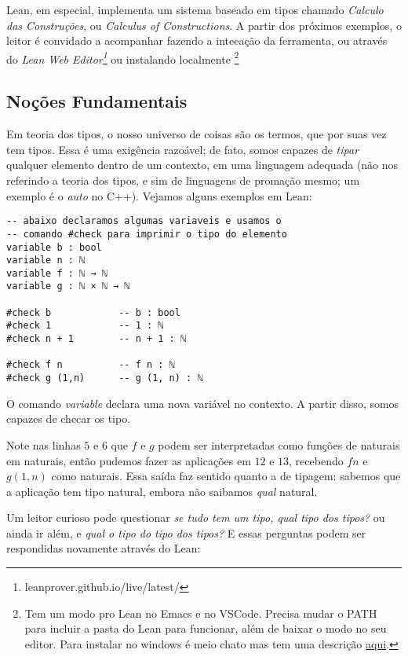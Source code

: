 Lean, em especial, implementa um sistema baseado em tipos chamado \textit{Calculo das Construções}, ou \textit{Calculus of Constructions}. A partir dos próximos exemplos, o leitor é convidado a acompanhar fazendo a inteeação da ferramenta, ou através do \textit{Lean Web Editor\footnote{leanprover.github.io/live/latest/}} ou instalando localmente \footnote{Tem um modo pro Lean no Emacs e no VSCode. Precisa mudar o PATH para incluir a pasta do Lean para funcionar, além de baixar o modo no seu editor. Para instalar no windows é meio chato mas tem uma descrição \href{https://xenaproject.wordpress.com/a-cheap-hack-to-get-lean-and-mathlib-running-on-a-windows-10-machine/}{aqui}.}

\subsection{Noções Fundamentais}
Em teoria dos tipos, o nosso universo de coisas são os termos, que por suas vez tem tipos. Essa é uma exigência razoável; de fato, somos capazes de \textit{tipar} qualquer elemento dentro de um contexto, em uma linguagem adequada (não nos referindo a teoria dos tipos, e sim de linguagens de promação mesmo; um exemplo é o \textit{auto} no C++). Vejamos alguns exemplos em Lean:

\vspace{5mm}
\begin{lstlisting}
-- abaixo declaramos algumas variaveis e usamos o
-- comando #check para imprimir o tipo do elemento
variable b : bool
variable n : ℕ
variable f : ℕ → ℕ
variable g : ℕ × ℕ → ℕ

#check b            -- b : bool
#check 1            -- 1 : ℕ
#check n + 1        -- n + 1 : ℕ

#check f n          -- f n : ℕ
#check g (1,n)      -- g (1, n) : ℕ
\end{lstlisting}
\vspace{5mm}

\noindent O comando \textit{variable} declara uma nova variável no contexto.
A partir disso, somos capazes de checar os tipo.

Note nas linhas $5$ e $6$ que $f$ e $g$ podem ser interpretadas como funções de naturais em naturais, então pudemos fazer as aplicações em $12$ e $13$, recebendo $f n$ e $g (1,n)$ como naturais.
Essa saída faz sentido quanto a de tipagem: sabemos que a aplicação tem tipo natural, embora não saibamos \textit{qual} natural.

Um leitor curioso pode questionar \textit{se tudo tem um tipo, qual tipo dos tipos?} ou ainda ir além, e \textit{qual o tipo do tipo dos tipos?} E essas perguntas podem ser respondidas novamente através do Lean:

